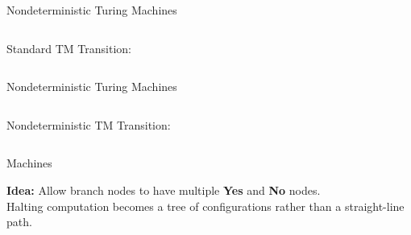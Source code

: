 \documentclass[c]{beamer}
\begin{document}




\begin{frame}{Nondeterministic Turing Machines}

  \begin{columns}

    Standard TM Transition:
       

    \begin{center}
      \detercomptm{}
    \end{center}
  \end{columns}
\end{frame}


\begin{frame}{Nondeterministic Turing Machines}

  \begin{columns}

    Nondeterministic TM Transition:
       

    \begin{center}
      \scaletopagewidth{\ndetercomptm{}}
    \end{center}
  \end{columns}
\end{frame}




  

\begin{frame}{\ndet Machines}

  \textbf{Idea:} Allow branch nodes to have multiple \textbf{Yes} and
  \textbf{No} nodes.\pause \\

  Halting computation becomes a tree of configurations rather than a
  straight-line path.
  
\end{frame}
\end{document}

